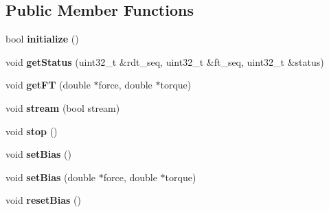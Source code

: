 \subsection*{Public Member Functions}
\begin{DoxyCompactItemize}
\item 
bool {\bfseries initialize} ()\hypertarget{classati__ft__sensor_1_1AtiFTSensor_aa8c6b79e86229c5a3040aa584b41315c}{}\label{classati__ft__sensor_1_1AtiFTSensor_aa8c6b79e86229c5a3040aa584b41315c}

\item 
void {\bfseries get\+Status} (uint32\+\_\+t \&rdt\+\_\+seq, uint32\+\_\+t \&ft\+\_\+seq, uint32\+\_\+t \&status)\hypertarget{classati__ft__sensor_1_1AtiFTSensor_ad81139f635267570ef24146aa42e79e3}{}\label{classati__ft__sensor_1_1AtiFTSensor_ad81139f635267570ef24146aa42e79e3}

\item 
void {\bfseries get\+FT} (double $\ast$force, double $\ast$torque)\hypertarget{classati__ft__sensor_1_1AtiFTSensor_a36beff3967fe1dee6e03e0f365003152}{}\label{classati__ft__sensor_1_1AtiFTSensor_a36beff3967fe1dee6e03e0f365003152}

\item 
void {\bfseries stream} (bool stream)\hypertarget{classati__ft__sensor_1_1AtiFTSensor_a8216e2f36a4d98a118c08f3a7975ed77}{}\label{classati__ft__sensor_1_1AtiFTSensor_a8216e2f36a4d98a118c08f3a7975ed77}

\item 
void {\bfseries stop} ()\hypertarget{classati__ft__sensor_1_1AtiFTSensor_a56e90ab175ed70198a5f7f17064d78ac}{}\label{classati__ft__sensor_1_1AtiFTSensor_a56e90ab175ed70198a5f7f17064d78ac}

\item 
void {\bfseries set\+Bias} ()\hypertarget{classati__ft__sensor_1_1AtiFTSensor_a659d13141fb516206fcf27c609dcab92}{}\label{classati__ft__sensor_1_1AtiFTSensor_a659d13141fb516206fcf27c609dcab92}

\item 
void {\bfseries set\+Bias} (double $\ast$force, double $\ast$torque)\hypertarget{classati__ft__sensor_1_1AtiFTSensor_a1eb465631b61e83def48c419d2994185}{}\label{classati__ft__sensor_1_1AtiFTSensor_a1eb465631b61e83def48c419d2994185}

\item 
void {\bfseries reset\+Bias} ()\hypertarget{classati__ft__sensor_1_1AtiFTSensor_a0746f28aa6b624427ad6b4074b64c859}{}\label{classati__ft__sensor_1_1AtiFTSensor_a0746f28aa6b624427ad6b4074b64c859}

\end{DoxyCompactItemize}
